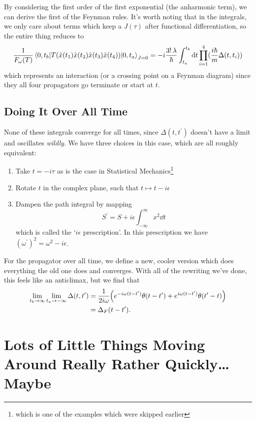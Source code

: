 \documentclass[]{revision-notes}
\begin{document}
By considering the first order of the first exponential (the anharmonic term), we can derive the first of the Feynman rules.
It's worth noting that in the integrals, we only care about terms which keep a \( J(\tau) \) after functional differentiation, so the entire thing reduces to \[\frac{1}{F_\omega(T)} \mel{0, t_b}{T(\hat{x}(t_1) \hat{x}(t_2) \hat{x}(t_3) \hat{x}(t_4)) }{0, t_a}_{J=0} = -i \frac{3!\, \lambda}{\hbar}\int_{t_a}^{t_b} \dd{t} \prod_{i=1}^{4}(\frac{i\hbar}{m}\Delta(t, t_i))\]
which represents an interaction (or a crossing point on a Feynman diagram) since they all four propagators go terminate or start at \(t\).

\section{Doing It Over All Time}
None of these integrals converge for all times, since \(\Delta(t, t^\prime)\) doesn't have a limit and oscillates \emph{wildly}.
We have three choices in this case, which are all roughly equivalent:
\begin{enumerate}
  \item Take \( t = -i\tau \) as is the case in Statistical Mechanics\footnote{which is one of the examples which were skipped earlier}
  \item Rotate \(t\) in the complex plane, such that \( t \mapsto t - i\epsilon \)
  \item Dampen the path integral by mapping \[ S^\prime = S + i\epsilon \int_{-\infty}^\infty x^2 \dd{t} \] which is called the `\(i\epsilon\) prescription'. In this prescription we have \( (\omega^\prime)^2 = \omega^2 - i \epsilon \).
\end{enumerate}

For the propagator over all time, we define a new, cooler version which does everything the old one does and converges.
With all of the rewriting we've done, this feels like an anticlimax, but we find that
\begin{align*}
  \lim_{t_b\to \infty}\lim_{t_a\to -\infty}\Delta(t, t^\prime) &= \frac{1}{2i\omega}\qty(e^{-i\omega(t-t^\prime)} \theta(t-t^\prime) + e^{i\omega(t-t^\prime)} \theta(t^\prime - t))\\
  &= \Delta_F(t- t^\prime).
\end{align*}

\chapter{Lots of Little Things Moving Around Really Rather Quickly\ldots{} Maybe}
\end{document}
